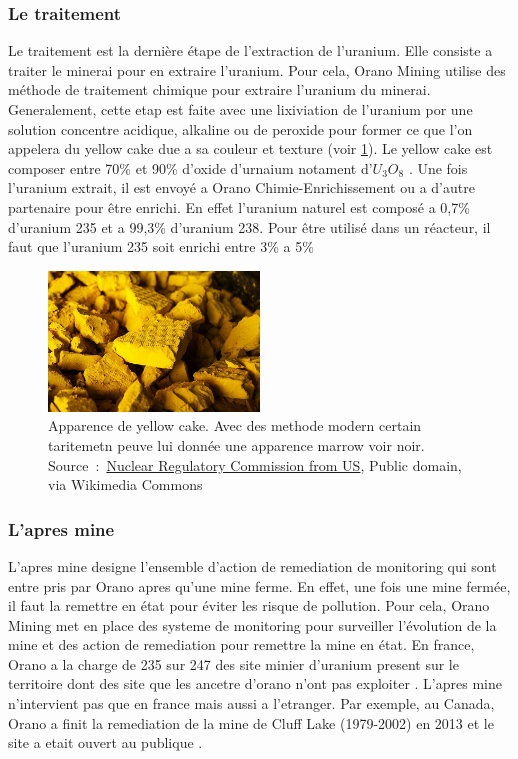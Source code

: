 \subsubsection{Le traitement}
Le traitement est la dernière étape de l'extraction de l'uranium. Elle consiste a traiter le minerai pour en extraire l'uranium. Pour cela, Orano Mining utilise des méthode de traitement chimique pour extraire l'uranium du minerai. Generalement, cette etap est faite avec une  lixiviation de l'uranium por une solution concentre acidique, alkaline ou de peroxide pour former ce que l'on appelera du yellow cake due a sa couleur et texture (voir \cref{fig_yellow-cake}). Le yellow cake est composer entre 70\% et 90\% d'oxide d'urnaium notament d'$U_3O_8$ \cite{article:composition-yellow-cake}. Une fois l'uranium extrait, il est envoyé a Orano Chimie-Enrichissement ou a d'autre partenaire pour être enrichi. En effet l'uranium naturel est composé a 0,7\% d'uranium 235 et a 99,3\% d'uranium 238\cite{}. Pour être utilisé dans un réacteur, il faut que l'uranium 235 soit enrichi entre 3\% a 5\% \cite{article:uranium-concentration}

\begin{figure}
    \centering
    \includegraphics[width=0.5\textwidth]{img/Yellow_Cake_Uranium_(14492248719).jpg}
    \caption{Apparence de yellow cake. Avec des methode modern certain taritemetn peuve lui donnée une apparence marrow voir noir. Source~:~\href{https://commons.wikimedia.org/wiki/File:Yellow_Cake_Uranium_(14492248719).jpg}{Nuclear Regulatory Commission from US}, Public domain, via Wikimedia Commons}
    \label{fig_yellow-cake}
\end{figure}

\subsubsection{L'apres mine}
L'apres mine designe l'ensemble d'action de remediation de monitoring qui sont entre pris par Orano apres qu'une mine ferme. En effet, une fois une mine fermée, il faut la remettre en état pour éviter les risque de pollution. Pour cela, Orano Mining met en place des systeme de monitoring pour surveiller l'évolution de la mine et des action de remediation pour remettre la mine en état. En france, Orano a la charge de 235 sur 247 des site minier d'uranium present sur le territoire dont des site que les ancetre d'orano n'ont pas exploiter \cite{site:orano_apres_mine}. L'apres mine n'intervient pas que en france mais aussi a l'etranger. Par exemple, au Canada, Orano a finit la remediation de la mine de Cluff Lake (1979-2002) en 2013 et le site a etait ouvert au publique \cite{site:Cluff_lake_remediation}.

